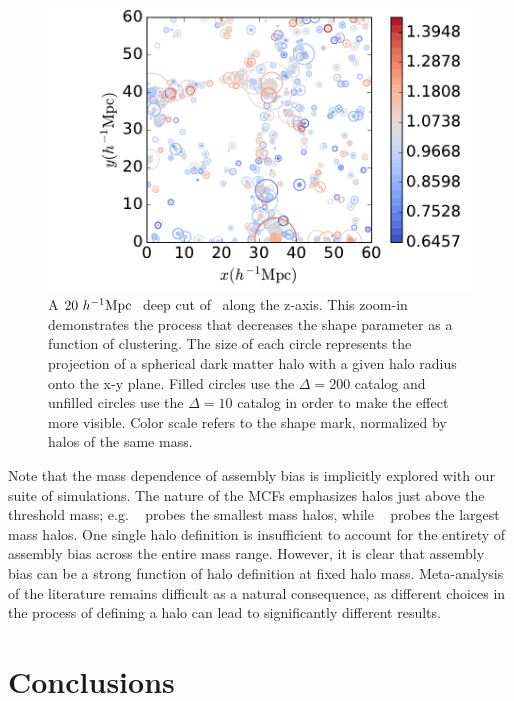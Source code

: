 \documentclass[usenatbib]{mnras}
\begin{document}
\begin{figure}
	\centering
	\includegraphics[width=.9\textwidth]{plotcircles.pdf}
	\caption{A $20 \ h^{-1}\mathrm{Mpc}~$ deep cut of \simB \ along the z-axis. This zoom-in demonstrates the process that decreases the shape parameter as a function of clustering. The size of each circle represents the projection of a spherical dark matter halo with a given halo radius onto the x-y plane. Filled circles use the $\Delta = 200$ catalog and unfilled circles use the $\Delta = 10$ catalog in order to make the effect more visible. Color scale refers to the shape mark, normalized by halos of the same mass.}
	\label{fig:plotcircles}
\end{figure}

Note that the mass dependence of assembly bias is implicitly explored with our suite of simulations.
The nature of the MCFs emphasizes halos just above the threshold mass; e.g. \simA~ probes the smallest mass
halos, while \simB~ probes the largest mass halos. One single halo definition is insufficient to account for the
entirety of assembly bias across the entire mass range. However, it is clear that assembly bias can be a strong
function of halo definition at fixed halo mass. Meta-analysis of the literature remains difficult as a natural
consequence, as different choices in the process of defining a halo can lead to significantly different results.


\section[]{Conclusions}
\label{section:conclusions}
\end{document}
